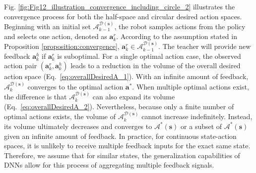 Fig. \ref{fig:Fig12_illustration_convergence_including_circle_2} illustrates the convergence process for both the half-space and circular desired action spaces.
Beginning with an initial set $\mathcal{A}^{\mathcal{D}(\bm s)}_{k-1}$, the robot samples actions from the policy and selects one action, denoted as $\bm a^r_{k}$. 
According to the assumption stated in Proposition \ref{proposition:convergence},
$\bm a^r_{k} \in \mathcal{A}^{\mathcal{D}(\bm s)}_{k-1}$. 
The teacher will provide new feedback $\bm a^h_{k}$ if $\bm a^r_{k}$ is suboptimal. 
For a single optimal action case, 
the observed action pair $(\bm a^r_{k}, \bm a^h_{k})$ leads to a reduction in the volume of the overall desired action space
(Eq.~\eqref{eq:overallDesiredA_1}). 
With an infinite amount of feedback, $\mathcal{A}^{\mathcal{D}(\bm s)}_k$ converges to the optimal action $\bm a^*$.
When multiple optimal actions exist, the difference is that $\mathcal{A}^{\mathcal{D}(\bm s)}_{k}$ can also expand its volume (Eq.~\eqref{eq:overallDesiredA_2}). Nevertheless, because only a finite number of optimal actions exists, the volume of $\mathcal{A}^{\mathcal{D}(\bm s)}_k$ cannot increase indefinitely. Instead, its volume ultimately decreases and converges to $\mathcal{A}^*(\bm s)$ or a subset of $\mathcal{A}^*(\bm s)$ given an infinite amount of feedback.
In practice, for continuous state-action spaces, it is unlikely to receive multiple feedback inputs for the exact same state. Therefore, we assume that for similar states, the generalization capabilities of DNNs allow for this process of aggregating multiple feedback signals.











